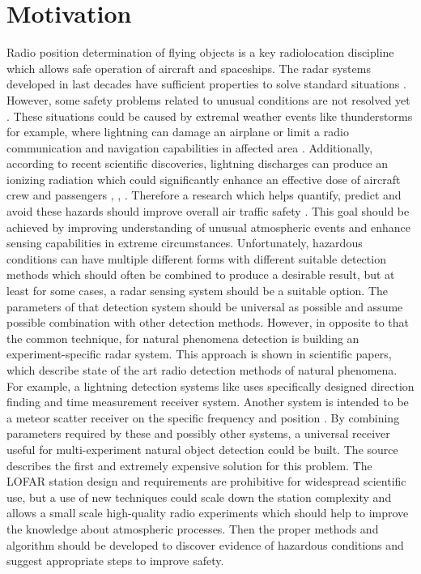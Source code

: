 \documentclass[twoside]{ctuthesis}
\theoremstyle{plain}
\theoremstyle{definition}
\theoremstyle{note}
\begin{document}
\maketitle

\chapter{Motivation}
Radio position determination of flying objects is a key radiolocation discipline which allows safe operation of aircraft and spaceships. The radar systems developed in last decades have sufficient properties to solve standard situations \cite{Radar_basics}. However, some safety problems related to unusual conditions are not resolved yet \cite{lightning_dose1}. These situations could be caused by extremal weather events like thunderstorms for example, where lightning can damage an airplane or limit a radio communication and navigation capabilities in affected area \cite{lightning_dose2}. Additionally, according to recent scientific discoveries, lightning discharges can produce an ionizing radiation which could significantly enhance an effective dose of aircraft crew and passengers \cite{lightning_dose3}, \cite{lightning_dose4}, \cite{lightning_dose6}. 
Therefore a research which helps quantify, predict and avoid these hazards should improve overall air traffic safety \cite{lightning_dose5}. This goal should be achieved by improving understanding of unusual atmospheric events and enhance sensing capabilities in extreme circumstances. 
Unfortunately, hazardous conditions can have multiple different forms with different suitable detection methods which should often be combined to produce a desirable result, but at least for some cases, a radar sensing system should be a suitable option. 
The parameters of that detection system should be universal as possible and assume possible combination with other detection methods. 
However, in opposite to that the common technique, for natural phenomena detection is building an experiment-specific radar system. 
This approach is shown in scientific papers, which describe state of the art radio detection methods of natural phenomena. For example, a lightning detection systems like \cite{NMLMA} uses specifically designed direction finding and time measurement receiver system.  Another system is intended to be a meteor scatter receiver on the specific frequency and position \cite{BRAMS}. 
By combining parameters required by these and possibly other systems, a universal receiver useful for multi-experiment natural object detection could be built. The source \cite{LOFAR} describes the first and extremely expensive solution for this problem. The LOFAR station design and requirements are prohibitive for widespread scientific use, but a use of new techniques could scale down the station complexity and allows a small scale high-quality radio experiments which should help to improve the knowledge about atmospheric processes. Then the proper methods and algorithm should be developed to discover evidence of hazardous conditions and suggest appropriate steps to improve safety. 
\end{document}
